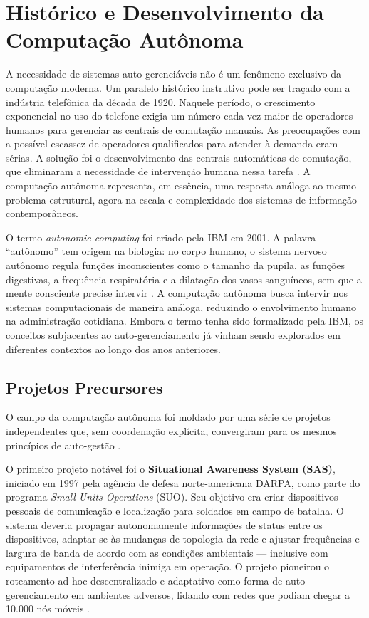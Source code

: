 \section{Histórico e Desenvolvimento da Computação Autônoma}
\label{sec:historico}

A necessidade de sistemas auto-gerenciáveis não é um fenômeno exclusivo da computação moderna. Um paralelo histórico instrutivo pode ser traçado com a indústria telefônica da década de 1920. Naquele período, o crescimento exponencial no uso do telefone exigia um número cada vez maior de operadores humanos para gerenciar as centrais de comutação manuais. As preocupações com a possível escassez de operadores qualificados para atender à demanda eram sérias. A solução foi o desenvolvimento das centrais automáticas de comutação, que eliminaram a necessidade de intervenção humana nessa tarefa \cite{W1999392360}. A computação autônoma representa, em essência, uma resposta análoga ao mesmo problema estrutural, agora na escala e complexidade dos sistemas de informação contemporâneos.

O termo \textit{autonomic computing} foi criado pela IBM em 2001. A palavra ``autônomo'' tem origem na biologia: no corpo humano, o sistema nervoso autônomo regula funções inconscientes como o tamanho da pupila, as funções digestivas, a frequência respiratória e a dilatação dos vasos sanguíneos, sem que a mente consciente precise intervir \cite{W1999392360}. A computação autônoma busca intervir nos sistemas computacionais de maneira análoga, reduzindo o envolvimento humano na administração cotidiana. Embora o termo tenha sido formalizado pela IBM, os conceitos subjacentes ao auto-gerenciamento já vinham sendo explorados em diferentes contextos ao longo dos anos anteriores.

\subsection{Projetos Precursores}
\label{subsec:projetos-precursores}

O campo da computação autônoma foi moldado por uma série de projetos independentes que, sem coordenação explícita, convergiram para os mesmos princípios de auto-gestão \cite{W1999392360}.

O primeiro projeto notável foi o \textbf{Situational Awareness System (SAS)}, iniciado em 1997 pela agência de defesa norte-americana DARPA, como parte do programa \textit{Small Units Operations} (SUO). Seu objetivo era criar dispositivos pessoais de comunicação e localização para soldados em campo de batalha. O sistema deveria propagar autonomamente informações de status entre os dispositivos, adaptar-se às mudanças de topologia da rede e ajustar frequências e largura de banda de acordo com as condições ambientais --- inclusive com equipamentos de interferência inimiga em operação. O projeto pioneirou o roteamento ad-hoc descentralizado e adaptativo como forma de auto-gerenciamento em ambientes adversos, lidando com redes que podiam chegar a 10.000 nós móveis \cite{W1999392360}.

